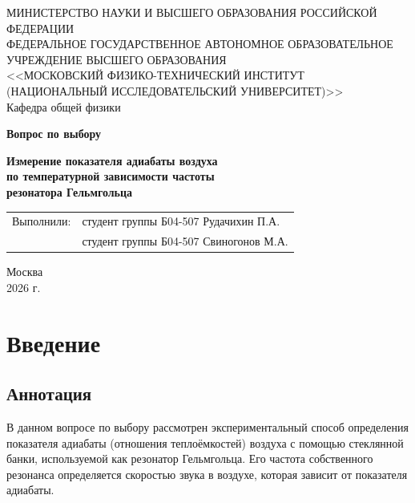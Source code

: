 \documentclass[12pt]{extreport}
\begin{document}
	\begin{titlepage}
		\begin{center}
			{\small МИНИСТЕРСТВО НАУКИ И ВЫСШЕГО ОБРАЗОВАНИЯ РОССИЙСКОЙ ФЕДЕРАЦИИ \\
				ФЕДЕРАЛЬНОЕ ГОСУДАРСТВЕННОЕ АВТОНОМНОЕ ОБРАЗОВАТЕЛЬНОЕ УЧРЕЖДЕНИЕ ВЫСШЕГО ОБРАЗОВАНИЯ \\
				<<МОСКОВСКИЙ ФИЗИКО-ТЕХНИЧЕСКИЙ ИНСТИТУТ \\
				(НАЦИОНАЛЬНЫЙ ИССЛЕДОВАТЕЛЬСКИЙ УНИВЕРСИТЕТ)>>\\
				Кафедра общей физики}
			
			\vfill
			
			{\large \textbf{Вопрос по выбору}}\\
			
			\vspace{0.5cm}
			
			{\Large\textbf{Измерение показателя адиабаты воздуха}} \\
			{\Large\textbf{по температурной зависимости частоты}} \\
			{\Large\textbf{резонатора Гельмгольца}}	
			
			\vfill
			
			\begin{flushright}
				\begin{tabular}{r l}
					Выполнили: & студент группы Б04-507 Рудачихин П.А. \\
					& студент группы Б04-507 Свиногонов М.А. \\	
				\end{tabular}
			\end{flushright}
			\vfill
			Москва \\
			2026 г.
		\end{center}
	\end{titlepage}
	
	
	\pagestyle{empty}
	\tableofcontents
	\clearpage
	\pagestyle{fancy}	
	\fancyhf{}
	\fancyhead[L]{\leftmark}
	\fancyhead[R]{\rightmark}
	\fancyfoot[C]{\thepage}
	
	\chapter{Введение}
	
	\section{Аннотация}
	
	\hspace{4mm} В данном вопросе по выбору рассмотрен экспериментальный способ определения показателя адиабаты (отношения теплоёмкостей) воздуха с помощью стеклянной банки, используемой как резонатор Гельмгольца. Его частота собственного резонанса определяется скоростью звука в воздухе, которая зависит от показателя адиабаты. 
	
\end{document}
